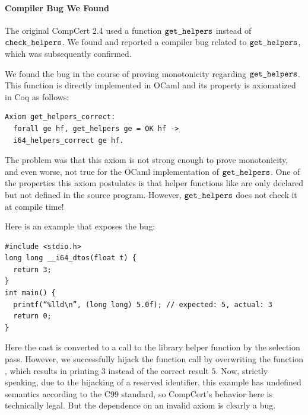 
\paragraph{Compiler Bug We Found}
The original CompCert 2.4 used a function $\texttt{get\_helpers}$
instead of $\texttt{check\_helpers}$.  We found and reported a
compiler bug related to $\texttt{get\_helpers}$, which was
subsequently confirmed.

We found the bug in the course of proving monotonicity regarding
$\texttt{get\_helpers}$. This function is directly implemented in
OCaml and its property is axiomatized in Coq as follows:
\begin{verbatim}
Axiom get_helpers_correct:
  forall ge hf, get_helpers ge = OK hf ->
  i64_helpers_correct ge hf.
\end{verbatim}
The problem was that this axiom is not strong enough to prove
monotonicity, and even worse, not true for the OCaml implementation of
$\texttt{get\_helpers}$. One of the properties this axiom postulates
is that helper functions like  are only
declared but not defined in the source program. However,
$\texttt{get\_helpers}$ does not check it at compile time!

Here is an example that exposes the bug:
\begin{verbatim}
#include <stdio.h>
long long __i64_dtos(float t) {
  return 3;
}
int main() {
  printf(“%lld\n”, (long long) 5.0f); // expected: 5, actual: 3
  return 0;
}
\end{verbatim}
Here the cast  is converted to a call to the
library helper function  by the selection
pass. However, we successfully hijack the function call by overwriting
the function , which results in printing $3$
instead of the correct result $5$.  Now, strictly speaking, due to the
hijacking of a reserved identifier, this example has undefined
semantics according to the C99 standard, so CompCert's behavior here
is technically legal.  But the dependence on an invalid axiom is
clearly a bug.


